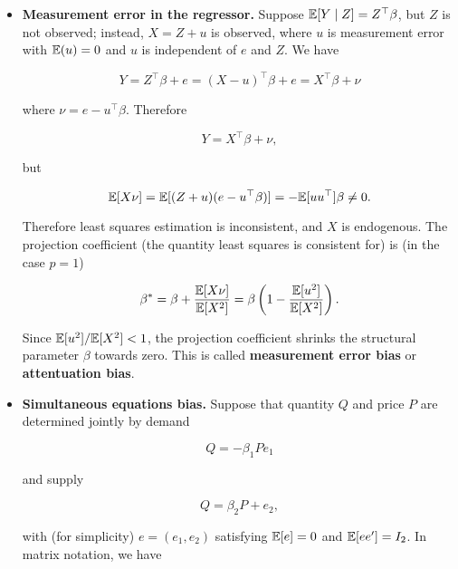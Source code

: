 \begin{itemize}

\item \textbf{Measurement error in the regressor.} Suppose \(\E[Y \mid Z] = Z^\top \beta\), but \(Z\) is not observed; instead, \(X = Z + u\) is observed, where \(u\) is measurement error with \(\E(u) = 0\) and \(u\) is independent of \(e\) and \(Z\). We have

\[
Y = Z^\top \beta + e = (X - u)^\top \beta + e = X^\top \beta + \nu
\]

where \(\nu = e - u^\top \beta\). Therefore

\[
Y = X^\top \beta + \nu,
\]

but

\[
\E[X \nu] = \E[(Z +u)(e - u^\top \beta)] = - \E[u u^\top] \beta \neq 0.
\]

Therefore least squares estimation is inconsistent, and \(X\) is endogenous. The projection coefficient (the quantity least squares is consistent for) is (in the case \(p=1\))

\[
\beta^* = \beta + \frac{\E[X \nu]}{\E[X^2]} = \beta \left(1 - \frac{\E[u^2]}{\E[X^2]} \right).
\]

Since \(\E[u^2]/\E[X^2] < 1\), the projection coefficient shrinks the structural parameter \(\beta\) towards zero. This is called \textbf{measurement error bias} or \textbf{attentuation bias}.

\item \textbf{Simultaneous equations bias.} Suppose that quantity \(Q\) and price \(P\) are determined jointly by demand

\[
Q = - \beta_1 P e_1
\]

and supply

\[
Q = \beta_2 P + e_2,
\]

with (for simplicity) \(e = (e_1, e_2)\) satisfying \(\E[e] = 0\) and \(\E[e e'] = I_2\). In matrix notation, we have


\end{itemize}
